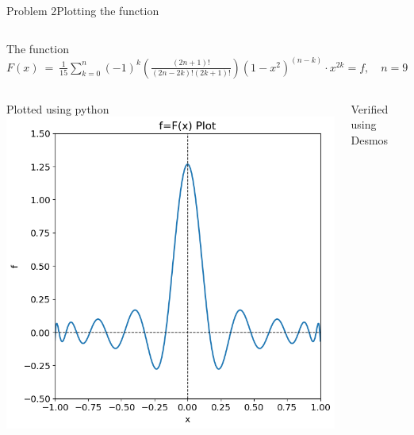 \documentclass{beamer}
\begin{document}
\begin{frame}{Problem 2}{Plotting the function}
    \vspace{-0.7em}
    \begin{columns}
        \begin{block}{\footnotesize The function}
            \scriptsize
            $\displaystyle F(x)\ =\ \frac{1}{15}\sum_{k=0}^{n}\left(-1\right)^{k}\left(\frac{\left(2n+1\right)!}{\left(2n-2k\right)!\left(2k+1\right)!}\right)\left(1-x^{2}\right)^{\left(n-k\right)}\cdot x^{2k} = f, \quad n=9$
        \end{block}
    \end{columns}
    \vspace{-0.3em}
    \begin{columns}
        \footnotesize
        \begin{block}{\footnotesize Plotted using python}
            \includegraphics[width=\textwidth]{Figures/prob2_functionplot.png}
        \end{block}
        \begin{block}{\footnotesize Verified using Desmos}

\end{block}
\end{columns}
\end{frame}
\end{document}
